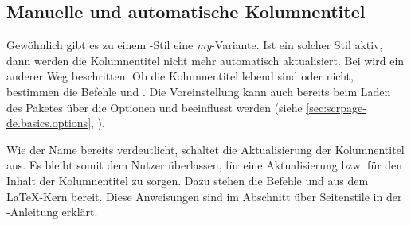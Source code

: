 \subsection{Manuelle und automatische Kolumnentitel}
\label{sec:scrpage-de.basics.mark}
%
\BeginIndexGroup
{}%
%
Gewöhnlich gibt es zu einem -Stil eine
\emph{my}-Variante. Ist ein solcher Stil aktiv, dann werden die Kolumnentitel
nicht mehr automatisch aktualisiert.  Bei  wird ein anderer
Weg beschritten.  Ob die Kolumnentitel lebend sind oder nicht, bestimmen die
Befehle  und . Die Voreinstellung kann auch
bereits beim Laden des Paketes über die Optionen  und
 beeinflusst werden (siehe
\autoref{sec:scrpage-de.basics.options},
).


\begin{Declaration}
\end{Declaration}%
Wie der Name bereits verdeutlicht, schaltet  die
Aktualisierung der Kolumnentitel aus.  Es bleibt somit dem Nutzer überlassen,
für eine Aktualisierung bzw. für den Inhalt der Kolumnentitel zu sorgen.  Dazu
stehen die Befehle  und
 aus dem \LaTeX-Kern bereit. Diese
Anweisungen sind im Abschnitt über Seitenstile in der \KOMAScript-Anleitung
erklärt.%
%
\EndIndexGroup


